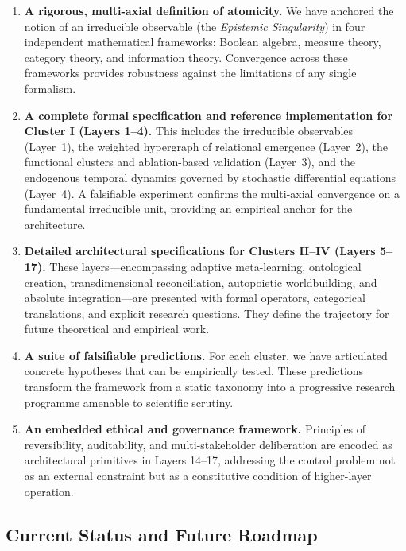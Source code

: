 \begin{enumerate}
    \item \textbf{A rigorous, multi-axial definition of atomicity.} We have anchored the notion of an irreducible observable (the \emph{Epistemic Singularity}) in four independent mathematical frameworks: Boolean algebra, measure theory, category theory, and information theory. Convergence across these frameworks provides robustness against the limitations of any single formalism.
    
    \item \textbf{A complete formal specification and reference implementation for Cluster I (Layers 1--4).} This includes the irreducible observables (Layer~1), the weighted hypergraph of relational emergence (Layer~2), the functional clusters and ablation-based validation (Layer~3), and the endogenous temporal dynamics governed by stochastic differential equations (Layer~4). A falsifiable experiment confirms the multi-axial convergence on a fundamental irreducible unit, providing an empirical anchor for the architecture.
    
    \item \textbf{Detailed architectural specifications for Clusters II--IV (Layers 5--17).} These layers---encompassing adaptive meta-learning, ontological creation, transdimensional reconciliation, autopoietic worldbuilding, and absolute integration---are presented with formal operators, categorical translations, and explicit research questions. They define the trajectory for future theoretical and empirical work.
    
    \item \textbf{A suite of falsifiable predictions.} For each cluster, we have articulated concrete hypotheses that can be empirically tested. These predictions transform the framework from a static taxonomy into a progressive research programme amenable to scientific scrutiny.
    
    \item \textbf{An embedded ethical and governance framework.} Principles of reversibility, auditability, and multi-stakeholder deliberation are encoded as architectural primitives in Layers 14--17, addressing the control problem not as an external constraint but as a constitutive condition of higher-layer operation.
\end{enumerate}

\subsection*{Current Status and Future Roadmap}

